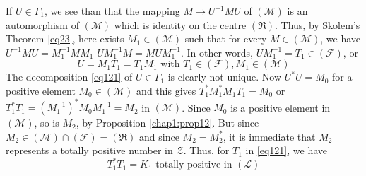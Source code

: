 If $U\in\Gamma_{1}$, we see than that the mapping $M\to U^{-1}MU$ of
$(\mathscr{M})$ is an automorphism of $(\mathscr{M})$ which is
identity on the centre $(\mathfrak{R})$. Thus, by Skolem's Theorem
\eqref{eq23}, here exists $M_{1}\in (\mathscr{M})$ such that for every
  $M\in(\mathscr{M})$, we have $U^{-1}MU=M^{-1}_{1}MM_{1}$ \ie
  $UM^{-1}_{1}M=MUM^{-1}_{1}$. In other words,
  $UM^{-1}_{1}=T_{1}\in(\mathscr{F})$, or 
\begin{equation*}
U=M_{1}T_{1}=T_{1}M_{1}\text{ \ with \ } T_{1}\in (\mathscr{F}),
M_{1}\in (\mathscr{M})\tag{121}\label{eq121}
\end{equation*}
The decomposition \eqref{eq121} of $U\in\Gamma_{1}$ is clearly not
unique. Now $U^{\ast}U=M_{0}$ for a positive element
$M_{0}\in(\mathscr{M})$ and this gives
$T^{\ast}_{1}M^{\ast}_{1}M_{1}T_{1}=M_{0}$ or
$T^{\ast}_{1}T_{1}=(M^{-1}_{1})^{\ast}M_{0}M^{-1}_{1}=M_{2}$ in
$(\mathscr{M})$. Since $M_{0}$ is a positive element in
$(\mathscr{M})$, so is $M_{2}$, by Proposition \ref{chap1:prop12}. But since
$M_{2}\in(\mathscr{M})\cap (\mathscr{F})=(\mathfrak{R})$ and since
$M_{2}=M^{\ast}_{2}$, it is immediate that $M_{2}$ represents a
totally positive number in $\mathscr{Z}$. Thus, for $T_{1}$ in
\eqref{eq121}, we have
\begin{equation*}
T^{\ast}_{1}T_{1}=K_{1}\text{ \  totally positive in \ }
(\mathscr{L})\tag{122}\label{eq122} 
\end{equation*}

